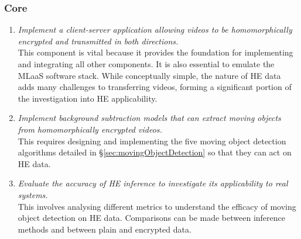 \subsubsection{Core}
\begin{enumerate}[leftmargin=1.75cm,label=\texttt{A\arabic*:}]
    \item \textit{Implement a client-server application allowing videos to be homomorphically encrypted and transmitted in both directions.} \smallskip \\ This component is vital because it provides the foundation for implementing and integrating all other components. It is also essential to emulate the MLaaS software stack. While conceptually simple, the nature of HE data adds many challenges to transferring videos, forming a significant portion of the investigation into HE applicability.
    \item \textit{Implement background subtraction models that can extract moving objects from homomorphically encrypted videos.} \smallskip \\ This requires designing and implementing the five moving object detection algorithms detailed in §\ref{sec:movingObjectDetection} so that they can act on HE data.
    \item \textit{Evaluate the accuracy of HE inference to investigate its applicability to real systems.} \smallskip \\ This involves analysing different metrics to understand the efficacy of moving object detection on HE data. Comparisons can be made between inference methods and between plain and encrypted data.
\end{enumerate}
